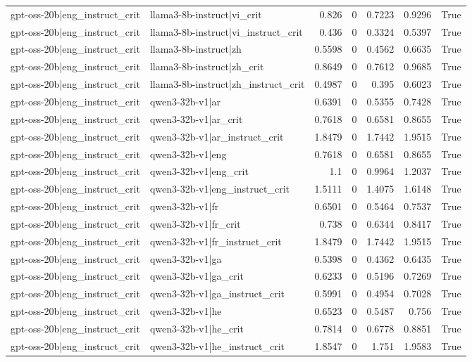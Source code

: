 \begin{table}
\begin{tabular}{l l r r r r l}
gpt-oss-20b|eng_instruct_crit & llama3-8b-instruct|vi_crit & 0.826 & 0 & 0.7223 & 0.9296 & True \\
gpt-oss-20b|eng_instruct_crit & llama3-8b-instruct|vi_instruct_crit & 0.436 & 0 & 0.3324 & 0.5397 & True \\
gpt-oss-20b|eng_instruct_crit & llama3-8b-instruct|zh & 0.5598 & 0 & 0.4562 & 0.6635 & True \\
gpt-oss-20b|eng_instruct_crit & llama3-8b-instruct|zh_crit & 0.8649 & 0 & 0.7612 & 0.9685 & True \\
gpt-oss-20b|eng_instruct_crit & llama3-8b-instruct|zh_instruct_crit & 0.4987 & 0 & 0.395 & 0.6023 & True \\
gpt-oss-20b|eng_instruct_crit & qwen3-32b-v1|ar & 0.6391 & 0 & 0.5355 & 0.7428 & True \\
gpt-oss-20b|eng_instruct_crit & qwen3-32b-v1|ar_crit & 0.7618 & 0 & 0.6581 & 0.8655 & True \\
gpt-oss-20b|eng_instruct_crit & qwen3-32b-v1|ar_instruct_crit & 1.8479 & 0 & 1.7442 & 1.9515 & True \\
gpt-oss-20b|eng_instruct_crit & qwen3-32b-v1|eng & 0.7618 & 0 & 0.6581 & 0.8655 & True \\
gpt-oss-20b|eng_instruct_crit & qwen3-32b-v1|eng_crit & 1.1 & 0 & 0.9964 & 1.2037 & True \\
gpt-oss-20b|eng_instruct_crit & qwen3-32b-v1|eng_instruct_crit & 1.5111 & 0 & 1.4075 & 1.6148 & True \\
gpt-oss-20b|eng_instruct_crit & qwen3-32b-v1|fr & 0.6501 & 0 & 0.5464 & 0.7537 & True \\
gpt-oss-20b|eng_instruct_crit & qwen3-32b-v1|fr_crit & 0.738 & 0 & 0.6344 & 0.8417 & True \\
gpt-oss-20b|eng_instruct_crit & qwen3-32b-v1|fr_instruct_crit & 1.8479 & 0 & 1.7442 & 1.9515 & True \\
gpt-oss-20b|eng_instruct_crit & qwen3-32b-v1|ga & 0.5398 & 0 & 0.4362 & 0.6435 & True \\
gpt-oss-20b|eng_instruct_crit & qwen3-32b-v1|ga_crit & 0.6233 & 0 & 0.5196 & 0.7269 & True \\
gpt-oss-20b|eng_instruct_crit & qwen3-32b-v1|ga_instruct_crit & 0.5991 & 0 & 0.4954 & 0.7028 & True \\
gpt-oss-20b|eng_instruct_crit & qwen3-32b-v1|he & 0.6523 & 0 & 0.5487 & 0.756 & True \\
gpt-oss-20b|eng_instruct_crit & qwen3-32b-v1|he_crit & 0.7814 & 0 & 0.6778 & 0.8851 & True \\
gpt-oss-20b|eng_instruct_crit & qwen3-32b-v1|he_instruct_crit & 1.8547 & 0 & 1.751 & 1.9583 & True \\

\end{tabular}
\end{table}
